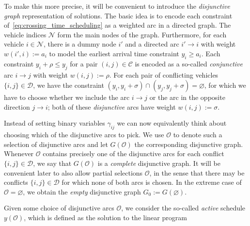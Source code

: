 \documentclass[a4paper]{report}
\theoremstyle{definition}
\theoremstyle{plain}
\begin{document}
To make this more precise, it will be convenient to introduce the
\emph{disjunctive graph} representation of solutions.
%
The basic idea is to encode each constraint
of~\eqref{eq:crossing_time_scheduling} as a weighted arc in a directed graph.
%
The vehicle indices $\mathcal{N}$ form the main nodes of the graph.
%
Furthermore, for each vehicle $i \in \mathcal{N}$, there is a dummy node $i'$
and a directed arc $i' \rightarrow i$ with weight $w(i', i) := a_i$ to model the
earliest arrival time constraint $y_i \geq a_i$.
%
Each constraint $y_i + \rho \leq y_j$ for a pair $(i,j) \in \mathcal{C}$ is
encoded as a so-called \emph{conjunctive} arc $i \rightarrow j$ with weight
$w(i,j) := \rho$.
%
For each pair of conflicting vehicles $\{i,j\} \in \mathcal{D}$, we have the
constraint $(y_i, y_i + \sigma) \cap (y_j, y_j + \sigma) = \varnothing$, for
which we have to choose whether we include the arc $i \rightarrow j$ or the arc
in the opposite direction $j \rightarrow i$; both of these \emph{disjunctive}
arcs have weight $w(i,j) := \sigma$.

Instead of setting binary variables $\gamma_{ij}$ we can now equivalently think
about choosing which of the disjunctive arcs to pick. We use $\mathcal{O}$
to denote such a selection of disjunctive arcs and let $G(\mathcal{O})$ the
corresponding disjunctive graph.
%
Whenever $\mathcal{O}$ contains precisely one of the disjunctive arcs for each
conflict $\{i,j\} \in \mathcal{D}$, we say that $G(\mathcal{O})$ is a
\emph{complete} disjunctive graph.
%
It will be convenient later to also allow partial selections $\mathcal{O}$, in
the sense that there may be conflicts $\{i,j\} \in \mathcal{D}$ for which none
of both arcs is chosen.
%
In the extreme case of $\mathcal{O} = \varnothing$, we obtain the \emph{empty}
disjunctive graph $G_0 := G(\varnothing)$.

Given some choice of disjunctive arcs $\mathcal{O}$, we consider the so-called
\textit{active} schedule $y(\mathcal{O})$, which is defined as the solution to
the linear program
\end{document}
